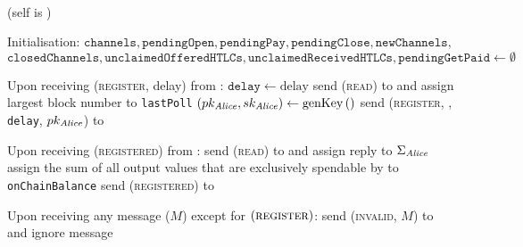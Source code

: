 \ \\  (self is \alice)
  \label{alg:lightningprot}
  \begin{algorithmic}[1]
    \State Initialisation:
    \Indent
      \State $\mathtt{channels}, \mathtt{pendingOpen}, \mathtt{pendingPay},
      \mathtt{pendingClose}, \mathtt{newChannels},$ $\mathtt{closedChannels},
      \mathtt{unclaimedOfferedHTLCs}, \mathtt{unclaimedReceivedHTLCs},
      \mathtt{pendingGetPaid} \gets \emptyset$
    \EndIndent
    \State

    \State Upon receiving (\textsc{register}, delay) from \environment:
    \Indent
      \State $\mathtt{delay} \gets \mathrm{delay}$
      \State send (\textsc{read}) to \ledger{} and assign largest block number
      to \texttt{lastPoll}
      \State $\left(pk_{\mathit{Alice}}, sk_{\mathit{Alice}}\right) \gets
      \mathrm{genKey}\left(\right)$
      \State send (\textsc{register}, \alice, \texttt{delay},
      $pk_{\mathit{Alice}}$) to \adversary {}
    \EndIndent
    \State

    \State Upon receiving (\textsc{registered}) from \adversary:
    \Indent
      \State send (\textsc{read}) to \ledger{} and assign reply to
      $\Sigma_{\mathit{Alice}}$
      \State assign the sum of all output values that are exclusively spendable
      by \alice{} to \texttt{onChainBalance}
      \State send (\textsc{registered}) to \environment
    \EndIndent
    \State

    \State Upon receiving any message ($M$) except for
    $\left(\textsc{register}\right)$:
    \Indent
        \State send (\textsc{invalid}, $M$) to \adversary{} and ignore message
      \EndIf
    \EndIndent
    \State


\end{algorithmic}
